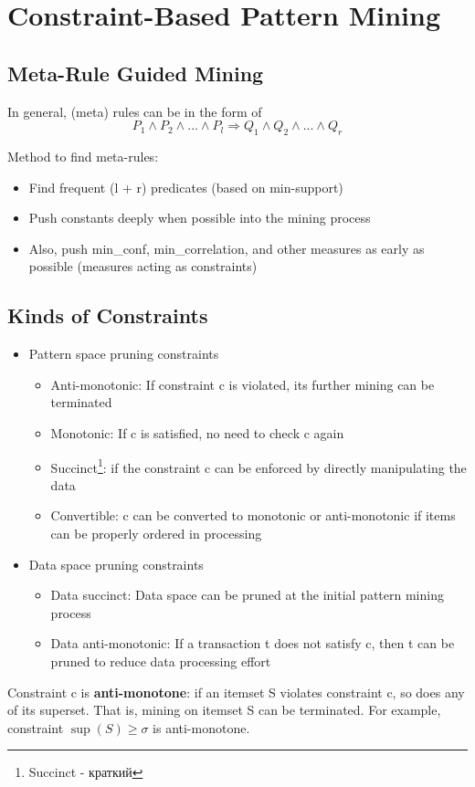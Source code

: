 \section{Constraint-Based Pattern Mining}
\subsection{Meta-Rule Guided Mining}
In general, (meta) rules can be in the form of
\begin{equation*}
P_1 \wedge P_2 \wedge ... \wedge P_l \Rightarrow Q_1 \wedge Q_2 \wedge ... \wedge Q_r
\end{equation*}

Method to find meta-rules:
\begin{itemize}
\item Find frequent (l + r) predicates (based on min-support)
\item Push constants deeply when possible into the mining process
\item Also, push min\_conf, min\_correlation, and other measures as early as possible (measures acting as constraints)
\end{itemize}

\subsection{Kinds of Constraints}
\begin{itemize}
\item Pattern space pruning constraints
\begin{itemize}
\item Anti-monotonic: If constraint c is violated, its further mining can be terminated
\item Monotonic: If c is satisfied, no need to check c again
\item Succinct\footnote{Succinct - краткий}: if the constraint c can be enforced by directly manipulating the data
\item Convertible: c can be converted to monotonic or anti-monotonic if items can be properly ordered in processing
\end{itemize}
\item Data space pruning constraints
\begin{itemize}
\item Data succinct: Data space can be pruned at the initial pattern mining process
\item Data anti-monotonic: If a transaction t does not satisfy c, then t can be pruned to reduce data processing effort
\end{itemize}
\end{itemize}

Constraint c is \textbf{anti-monotone}: if an itemset S violates constraint c, so does any of its superset. That is, mining on itemset S can be terminated. For example, constraint $\sup(S) \geqslant \sigma$ is anti-monotone.